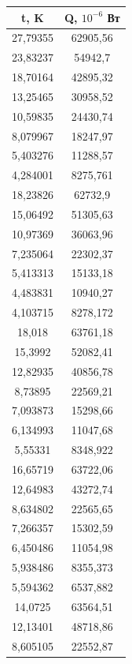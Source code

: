 \documentclass[a4paper]{article}
\begin{document}
	\begin{table}
 		\centering
    	\begin{tabular}{| c | c |}
    		\hline
    		t, K & Q, $10^{-6}$ Вт\\
    		\hline
    		27,79355 & 62905,56\\
    		\hline
23,83237&	54942,7\\
    		\hline
18,70164	&42895,32\\
    		\hline
13,25465&	30958,52\\
    		\hline
10,59835&24430,74\\
    		\hline
8,079967	&18247,97\\
    		\hline
5,403276&	11288,57\\
    		\hline
4,284001	&8275,761\\
    		\hline
18,23826&	62732,9\\
    		\hline
15,06492	&51305,63\\
    		\hline
10,97369&	36063,96\\
    		\hline
7,235064&	22302,37\\
    		\hline
5,413313	&15133,18\\
    		\hline
4,483831&	10940,27\\
    		\hline
4,103715&	8278,172\\
    		\hline
18,018	&63761,18\\
    		\hline
15,3992	&52082,41\\
    		\hline
12,82935&	40856,78\\
    		\hline
8,73895	&22569,21\\
    		\hline
7,093873	&15298,66\\
    		\hline
6,134993	&11047,68\\
    		\hline
5,55331	&8348,922\\
    		\hline
16,65719&	63722,06\\
    		\hline
12,64983	&43272,74\\
    		\hline
8,634802	&22565,65\\
    		\hline
7,266357	&15302,59\\
    		\hline
6,450486&	11054,98\\
    		\hline
5,938486	&8355,373\\
    		\hline
5,594362	&6537,882\\
    		\hline
14,0725	&63564,51\\
    		\hline
12,13401&	48718,86\\
    		\hline
8,605105&	22552,87\\
    		\hline

\end{tabular}
\end{table}
\end{document}
